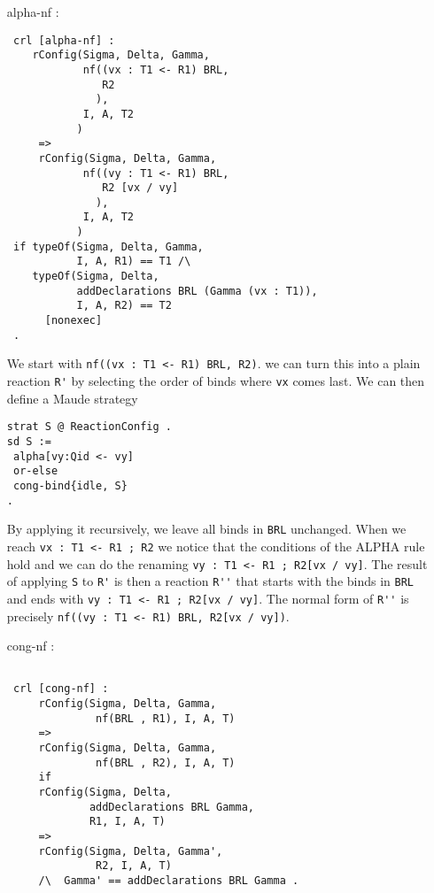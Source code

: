 \documentclass{article}
\begin{document}
\begin{itemize}
 
\item[alpha-nf]:
\begin{lstlisting}
 crl [alpha-nf] : 
    rConfig(Sigma, Delta, Gamma, 
            nf((vx : T1 <- R1) BRL,
               R2
              ),
            I, A, T2    
           )
     => 
     rConfig(Sigma, Delta, Gamma, 
            nf((vy : T1 <- R1) BRL,
               R2 [vx / vy] 
              ),
            I, A, T2    
           )   
 if typeOf(Sigma, Delta, Gamma, 
           I, A, R1) == T1 /\
    typeOf(Sigma, Delta, 
           addDeclarations BRL (Gamma (vx : T1)), 
           I, A, R2) == T2          
      [nonexec]        
 .
 \end{lstlisting}
 
 We start with \verb+nf((vx : T1 <- R1) BRL, R2)+.
we can turn this into a plain reaction \verb+R'+
 by selecting the order of binds where
\verb+vx+ comes last. We can then define a Maude strategy 
\begin{lstlisting}
strat S @ ReactionConfig .
sd S := 
 alpha[vy:Qid <- vy] 
 or-else 
 cong-bind{idle, S}
.
 \end{lstlisting}
By applying it recursively, we leave all binds in \verb+BRL+ unchanged. When we reach
\verb+vx : T1 <- R1 ; R2+
we notice that the conditions of the ALPHA rule hold and we can do the renaming
\verb+vy : T1 <- R1 ; R2[vx / vy]+.
The result of applying \verb+S+ to \verb+R'+ 
is then a reaction \verb+R''+ that starts with the binds in \verb+BRL+ 
and ends with \verb+vy : T1 <- R1 ; R2[vx / vy]+.
The normal form of \verb+R''+ is precisely 
\verb+nf((vy : T1 <- R1) BRL, R2[vx / vy])+.
 
\item[cong-nf]:
\begin{lstlisting} 
 
 crl [cong-nf] :
     rConfig(Sigma, Delta, Gamma, 
              nf(BRL , R1), I, A, T)
     => 
     rConfig(Sigma, Delta, Gamma, 
              nf(BRL , R2), I, A, T)
     if 
     rConfig(Sigma, Delta, 
             addDeclarations BRL Gamma, 
             R1, I, A, T) 
     => 
     rConfig(Sigma, Delta, Gamma', 
              R2, I, A, T) 
     /\  Gamma' == addDeclarations BRL Gamma .    
  \end{lstlisting} 
  

\end{itemize}
\end{document}
